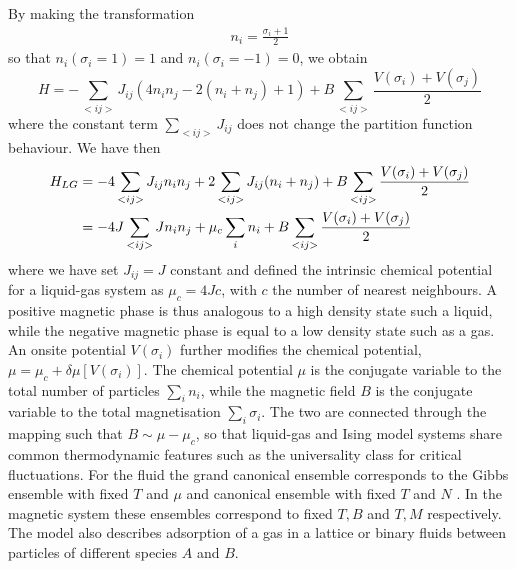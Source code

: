 By making the transformation\cite{goldenfeld_lectures_2018} 
\begin{align}
    n_i =  \frac{\sigma_i +1}{2}
\end{align}
so that $n_i(\sigma_i = 1) = 1$ and $n_i(\sigma_i = -1) = 0$, we obtain
\begin{equation}
	H =  - \sum_{< i j >}  J_{ij} \left( 4 n_i n_j -2 ( n_i+n_j) + 1 \right)+ B \sum_{< i j >}  \frac{V(\sigma_i)+V(\sigma_j)}{2}  
\end{equation}
where the constant term $\sum_{< i j >}  J_{ij}$ does not change the partition function behaviour. We have then
\begin{align}
	H_{LG} &=  - 4 \sum_{< i j >}  J_{ij}  n_i n_j  + 2 \sum_{< i j >}  J_{ij}  (n_i+n_j) + B \sum_{< i j >}  \frac{V(\sigma_i)+V(\sigma_j)}{2}  \nonumber \\
       &=  - 4 J \sum_{< i j >}  J n_i n_j  + \mu_c \sum_i  n_i + B \sum_{< i j >}   \frac{V(\sigma_i)+V(\sigma_j)}{2}  
\end{align}
where we have set $J_{ij} = J$ constant and defined the intrinsic chemical potential for a liquid-gas system as $\mu_c=4J c$, with  $c$ the number of nearest neighbours. A positive magnetic phase is thus analogous to a high density state such a liquid, while the negative magnetic phase is equal to a low density state such as a gas. An onsite potential $V(\sigma_i)$ further modifies the chemical potential, $\mu=\mu_c+\delta\mu[V(\sigma_i)]$.
The chemical potential $\mu$ is the conjugate variable to the total number of particles $\sum_i n_i$, while the magnetic field $B$ is the conjugate variable to the total magnetisation $\sum_i \sigma_i$. The two are connected through the mapping such that $B\sim \mu-\mu_c$, so that liquid-gas and Ising model systems share common thermodynamic features such as the universality class for critical fluctuations. For the fluid the grand canonical ensemble corresponds to the Gibbs ensemble with fixed $T$ and $\mu$ and canonical ensemble with fixed $T$ and $N$ . In the magnetic system these ensembles correspond to fixed $T, B$ and $T,M$ respectively. The model also describes adsorption of a gas in a lattice or binary fluids between particles of different species $A$ and $B$.



